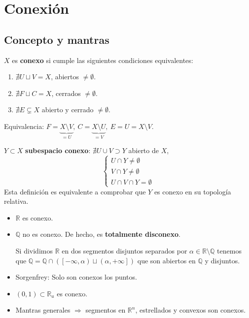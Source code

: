 \chapter{Conexión}%
\label{cha:conexion}
\section{Concepto y mantras}%
\label{sec:concepto_y_mantras_conx}
\begin{defi}
$X$ es \textbf{conexo} si cumple las siguientes condiciones equivalentes:
\begin{enumerate}
    \item $\nexists U \sqcup V = X$, abiertos $\neq \emptyset$.
    \item $\nexists F \sqcup C = X$, cerrados $\neq \emptyset$.
    \item $\nexists E \subsetneq X$ abierto y cerrado $\neq \emptyset$.
\end{enumerate}
\end{defi}
\begin{demo}
Equivalencia: $F = \underbrace{X \setminus V}_{= U},\ C = \underbrace{X \setminus U}_{= V},\ E = U = X \setminus V.$
\end{demo}

\begin{obs}
$Y \subset X$ \textbf{subespacio conexo}: $\nexists U \cup V \supset Y$ abierto de $X$, 
\[
\begin{cases}
    U \cap Y \neq \emptyset\\
    V \cap Y \neq \emptyset\\
    U \cap V \cap Y = \emptyset
\end{cases} 
\]
Esta definición es equivalente a comprobar que $Y$ es conexo en su topología relativa.
\end{obs}

\begin{ej}[Fundamental]
\begin{itemize}
    \item $\mathbb{R}$ es conexo.
    \item $\mathbb{Q}$ no es conexo. De hecho, es \textbf{totalmente disconexo}.
    \begin{demo}
        Si dividimos $\mathbb{R}$ en dos segmentos disjuntos separados por $\alpha \in \mathbb{R} \setminus \mathbb{Q}$ tenemos que $\mathbb{Q} = \mathbb{Q} \cap \left( \left[ -\infty, \alpha \right) \sqcup \left( \alpha, +\infty \right] \right)$ que son abiertos en $\mathbb{Q}$ y disjuntos.
    \end{demo}

    \item Sorgenfrey: Solo son conexos los puntos.
    \item $\left( 0, 1 \right) \subset \mathbb{R}_u$ es conexo. 
    \item\label{prop:conexos_rn} Mantras generales $\Rightarrow$ segmentos en $\mathbb{R}^n$, estrellados y convexos son conexos.
\end{itemize}

\end{ej}

